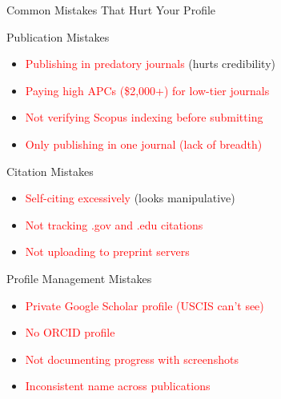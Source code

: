 \documentclass[11pt]{beamer}
\begin{document}
				\begin{frame}{Common Mistakes That Hurt Your Profile}
					\scriptsize
					\begin{block}{Publication Mistakes}
						\begin{itemize}
							\item \textcolor{red}{Publishing in predatory journals} (hurts credibility)
							\item \textcolor{red}{Paying high APCs (\$2,000+) for low-tier journals}
							\item \textcolor{red}{Not verifying Scopus indexing before submitting}
							\item \textcolor{red}{Only publishing in one journal (lack of breadth)}
						\end{itemize}
					\end{block}
					\begin{block}{Citation Mistakes}
						\begin{itemize}
							\item \textcolor{red}{Self-citing excessively} (looks manipulative)
							\item \textcolor{red}{Not tracking .gov and .edu citations}
							\item \textcolor{red}{Not uploading to preprint servers}
						\end{itemize}
					\end{block}
					\begin{block}{Profile Management Mistakes}
						\begin{itemize}
							\item \textcolor{red}{Private Google Scholar profile (USCIS can't see)}
							\item \textcolor{red}{No ORCID profile}
							\item \textcolor{red}{Not documenting progress with screenshots}
							\item \textcolor{red}{Inconsistent name across publications}
						\end{itemize}
					\end{block}
				\end{frame}
				
\end{document}
